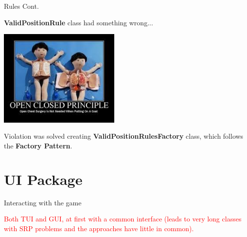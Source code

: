 \documentclass{beamer}
\begin{document}
  \begin{frame} {Rules Cont.}

    \textbf{ValidPositionRule} class had something wrong...

    \vspace{1em}


    \pause
    \hfill
    \includegraphics[width=0.45\textwidth]{img/openclosedprinciple.jpeg}

    \pause

    \vspace{1em}

    Violation was solved creating \textbf{ValidPositionRulesFactory} class, which follows the \textbf{Factory Pattern}.

  \end{frame}



\section{UI Package}


  \begin{frame}{Interacting with the game}

    \textcolor{red}{Both TUI and GUI, at first with a common interface (leads to very long classes with SRP problems and the approaches have little in common).}

  \end{frame}
\end{document}
